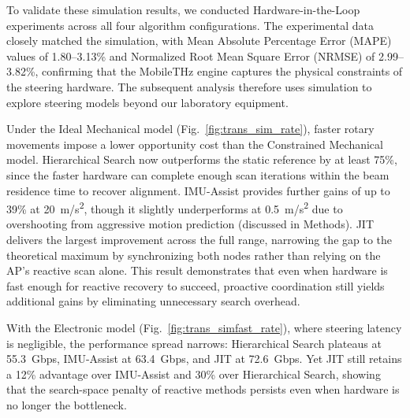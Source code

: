 \documentclass[fleqn,10pt]{wlscirep}
\newcommand{\rev}[1]{{\color{revblue}#1}}
\begin{document}
To validate these simulation results, we conducted Hardware-in-the-Loop experiments across all four algorithm configurations. The experimental data closely matched the simulation, with Mean Absolute Percentage Error (MAPE) values of 1.80--3.13\% and Normalized Root Mean Square Error (NRMSE) of 2.99--3.82\%, confirming that the MobileTHz engine captures the physical constraints of the steering hardware. The subsequent analysis therefore uses simulation to explore steering models beyond our laboratory equipment.

Under the Ideal Mechanical model (Fig.~\ref{fig:trans_sim_rate}), faster rotary movements impose a lower opportunity cost than the Constrained Mechanical model. Hierarchical Search now outperforms the static reference by at least 75\%, since the faster hardware can complete enough scan iterations within the beam residence time to recover alignment. IMU-Assist provides further gains of up to 39\% at \SI{20}{m/s^2}, though it slightly underperforms at \SI{0.5}{m/s^2} due to overshooting from aggressive motion prediction (discussed in Methods). JIT delivers the largest improvement across the full range, narrowing the gap to the theoretical maximum by synchronizing both nodes rather than relying on the AP's reactive scan alone. This result demonstrates that even when hardware is fast enough for reactive recovery to succeed, proactive coordination still yields \rev{additional} gains by eliminating unnecessary search overhead.

With the Electronic model (Fig.~\ref{fig:trans_simfast_rate}), where steering latency is negligible, the performance spread narrows: Hierarchical Search plateaus at \SI{55.3}{Gbps}, IMU-Assist at \SI{63.4}{Gbps}, and JIT at \SI{72.6}{Gbps}. Yet JIT still retains a 12\% advantage over IMU-Assist and 30\% over Hierarchical Search, showing that the search-space penalty of reactive methods persists even when hardware is no longer the bottleneck.
\end{document}
